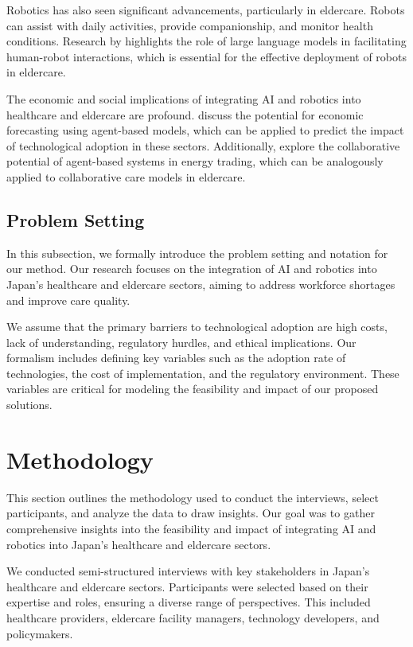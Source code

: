 \documentclass{article} %
\begin{document}
Robotics has also seen significant advancements, particularly in eldercare. Robots can assist with daily activities, provide companionship, and monitor health conditions. Research by \citet{shanahan2023role} highlights the role of large language models in facilitating human-robot interactions, which is essential for the effective deployment of robots in eldercare.

The economic and social implications of integrating AI and robotics into healthcare and eldercare are profound. \citet{poledna2023economic} discuss the potential for economic forecasting using agent-based models, which can be applied to predict the impact of technological adoption in these sectors. Additionally, \citet{zhou2023peer} explore the collaborative potential of agent-based systems in energy trading, which can be analogously applied to collaborative care models in eldercare.

\subsection{Problem Setting}

In this subsection, we formally introduce the problem setting and notation for our method. Our research focuses on the integration of AI and robotics into Japan's healthcare and eldercare sectors, aiming to address workforce shortages and improve care quality.

We assume that the primary barriers to technological adoption are high costs, lack of understanding, regulatory hurdles, and ethical implications. Our formalism includes defining key variables such as the adoption rate of technologies, the cost of implementation, and the regulatory environment. These variables are critical for modeling the feasibility and impact of our proposed solutions.

\section{Methodology}
\label{sec:method}

This section outlines the methodology used to conduct the interviews, select participants, and analyze the data to draw insights. Our goal was to gather comprehensive insights into the feasibility and impact of integrating AI and robotics into Japan's healthcare and eldercare sectors.

We conducted semi-structured interviews with key stakeholders in Japan's healthcare and eldercare sectors. Participants were selected based on their expertise and roles, ensuring a diverse range of perspectives. This included healthcare providers, eldercare facility managers, technology developers, and policymakers.
\end{document}
